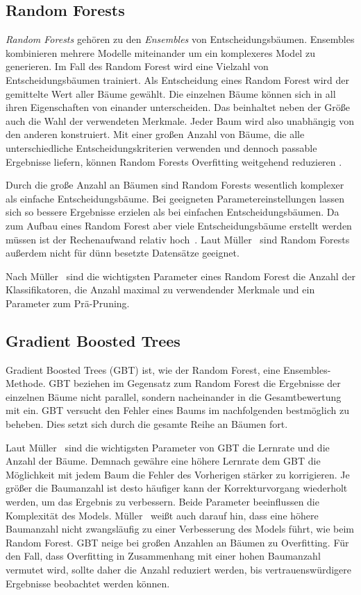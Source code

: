 \subsection{Random Forests}
\label{sec:random_forest}
\textit{Random Forests} gehören zu den \textit{Ensembles} von Entscheidungsbäumen. Ensembles kombinieren mehrere Modelle miteinander um ein komplexeres Model zu generieren. Im Fall des Random Forest wird eine Vielzahl von Entscheidungsbäumen trainiert. Als Entscheidung eines Random Forest wird der gemittelte Wert aller Bäume gewählt. Die einzelnen Bäume können sich in all ihren Eigenschaften von einander unterscheiden. Das beinhaltet neben der Größe auch die Wahl der verwendeten Merkmale. Jeder Baum wird also unabhängig von den anderen konstruiert. Mit einer großen Anzahl von Bäume, die alle unterschiedliche Entscheidungskriterien verwenden und dennoch passable Ergebnisse liefern, können Random Forests Overfitting weitgehend reduzieren \cite{Muller.2017}.

Durch die große Anzahl an Bäumen sind Random Forests wesentlich komplexer als einfache Entscheidungsbäume. Bei geeigneten Parametereinstellungen lassen sich so bessere Ergebnisse erzielen als bei einfachen Entscheidungsbäumen. Da zum Aufbau eines Random Forest aber viele Entscheidungsbäume erstellt werden müssen ist der Rechenaufwand relativ hoch~\cite[S.~84]{Muller.2017}. Laut Müller~\cite[S.~85]{Muller.2017} sind Random Forests außerdem nicht für dünn besetzte Datensätze geeignet.

Nach Müller~\cite[S.~85]{Muller.2017} sind die wichtigsten Parameter eines Random Forest die Anzahl der Klassifikatoren, die Anzahl maximal zu verwendender Merkmale und ein Parameter zum Prä-Pruning.
\subsection{Gradient Boosted Trees}
\label{sec:gradient_boosted_trees}
Gradient Boosted Trees (GBT) ist, wie der Random Forest, eine Ensembles-Methode. GBT beziehen im Gegensatz zum Random Forest die Ergebnisse der einzelnen Bäume nicht parallel, sondern nacheinander in die Gesamtbewertung mit ein. GBT versucht den Fehler eines Baums im nachfolgenden bestmöglich zu beheben. Dies setzt sich durch die gesamte Reihe an Bäumen fort.

Laut Müller~\cite{Muller.2017} sind die wichtigsten Parameter von GBT die Lernrate und die Anzahl der Bäume. Demnach gewähre eine höhere Lernrate dem GBT die Möglichkeit mit jedem Baum die Fehler des Vorherigen stärker zu korrigieren. Je größer die Baumanzahl ist desto häufiger kann der Korrekturvorgang wiederholt werden, um das Ergebnis zu verbessern. Beide Parameter beeinflussen die Komplexität des Models. Müller~\cite{Muller.2017} weißt auch darauf hin, dass eine höhere Baumanzahl nicht zwangsläufig zu einer Verbesserung des Models führt, wie beim Random Forest. GBT neige bei großen Anzahlen an Bäumen zu Overfitting. Für den Fall, dass Overfitting in Zusammenhang mit einer hohen Baumanzahl vermutet wird, sollte daher die Anzahl reduziert werden, bis vertrauenswürdigere Ergebnisse beobachtet werden können.

